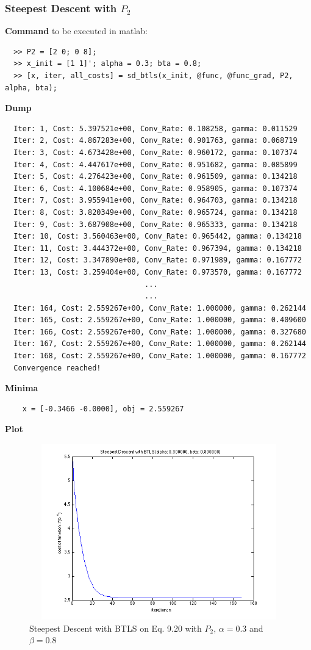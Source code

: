 \documentclass[11pt,a4paper]{article}
\begin{document}
\newpage \subsubsection{Steepest Descent with $P_2$}
{\bf Command} to be executed in matlab:
\begin{verbatim}
  >> P2 = [2 0; 0 8];
  >> x_init = [1 1]'; alpha = 0.3; bta = 0.8;
  >> [x, iter, all_costs] = sd_btls(x_init, @func, @func_grad, P2, alpha, bta);
\end{verbatim}
{\bf Dump}
\begin{verbatim}
  Iter: 1, Cost: 5.397521e+00, Conv_Rate: 0.108258, gamma: 0.011529
  Iter: 2, Cost: 4.867283e+00, Conv_Rate: 0.901763, gamma: 0.068719
  Iter: 3, Cost: 4.673428e+00, Conv_Rate: 0.960172, gamma: 0.107374
  Iter: 4, Cost: 4.447617e+00, Conv_Rate: 0.951682, gamma: 0.085899
  Iter: 5, Cost: 4.276423e+00, Conv_Rate: 0.961509, gamma: 0.134218
  Iter: 6, Cost: 4.100684e+00, Conv_Rate: 0.958905, gamma: 0.107374
  Iter: 7, Cost: 3.955941e+00, Conv_Rate: 0.964703, gamma: 0.134218
  Iter: 8, Cost: 3.820349e+00, Conv_Rate: 0.965724, gamma: 0.134218
  Iter: 9, Cost: 3.687908e+00, Conv_Rate: 0.965333, gamma: 0.134218
  Iter: 10, Cost: 3.560463e+00, Conv_Rate: 0.965442, gamma: 0.134218
  Iter: 11, Cost: 3.444372e+00, Conv_Rate: 0.967394, gamma: 0.134218
  Iter: 12, Cost: 3.347890e+00, Conv_Rate: 0.971989, gamma: 0.167772
  Iter: 13, Cost: 3.259404e+00, Conv_Rate: 0.973570, gamma: 0.167772
                                ...
                                ...
  Iter: 164, Cost: 2.559267e+00, Conv_Rate: 1.000000, gamma: 0.262144
  Iter: 165, Cost: 2.559267e+00, Conv_Rate: 1.000000, gamma: 0.409600
  Iter: 166, Cost: 2.559267e+00, Conv_Rate: 1.000000, gamma: 0.327680
  Iter: 167, Cost: 2.559267e+00, Conv_Rate: 1.000000, gamma: 0.262144
  Iter: 168, Cost: 2.559267e+00, Conv_Rate: 1.000000, gamma: 0.167772
  Convergence reached!
\end{verbatim}
{\bf Minima}
\begin{verbatim}
    x = [-0.3466 -0.0000], obj = 2.559267
   \end{verbatim}
{\bf Plot}
\begin{figure}[h]
    \centering
    \includegraphics[width=5in,height=3in]{../ps2_matlab/3.png}
    \caption{Steepest Descent with BTLS on
        Eq. 9.20 with $P_2$, $\alpha = 0.3$ and $\beta = 0.8$}
\end{figure}
\end{document}
